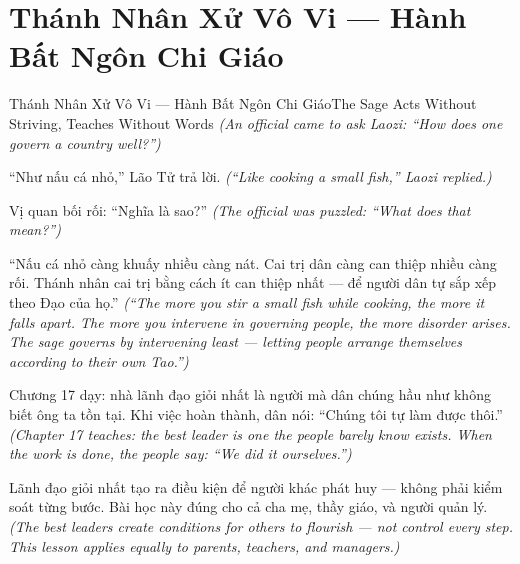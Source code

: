 \section{Thánh Nhân Xử Vô Vi — Hành Bất Ngôn Chi Giáo}
\begin{truyen}{Thánh Nhân Xử Vô Vi — Hành Bất Ngôn Chi Giáo}{The Sage Acts Without Striving, Teaches Without Words}
\textit{(An official came to ask Laozi: ``How does one govern a country well?'')}

``Như nấu cá nhỏ,'' Lão Tử trả lời.
\textit{(``Like cooking a small fish,'' Laozi replied.)}

Vị quan bối rối: ``Nghĩa là sao?''
\textit{(The official was puzzled: ``What does that mean?'')}

``Nấu cá nhỏ càng khuấy nhiều càng nát. Cai trị dân càng can thiệp nhiều càng rối. Thánh nhân cai trị bằng cách ít can thiệp nhất — để người dân tự sắp xếp theo Đạo của họ.''
\textit{(``The more you stir a small fish while cooking, the more it falls apart. The more you intervene in governing people, the more disorder arises. The sage governs by intervening least — letting people arrange themselves according to their own Tao.'')}

Chương 17 dạy: nhà lãnh đạo giỏi nhất là người mà dân chúng hầu như không biết ông ta tồn tại. Khi việc hoàn thành, dân nói: ``Chúng tôi tự làm được thôi.''
\textit{(Chapter 17 teaches: the best leader is one the people barely know exists. When the work is done, the people say: ``We did it ourselves.'')}

\end{truyen}

\begin{baihoc}
Lãnh đạo giỏi nhất tạo ra điều kiện để người khác phát huy — không phải kiểm soát từng bước. Bài học này đúng cho cả cha mẹ, thầy giáo, và người quản lý.
\textit{(The best leaders create conditions for others to flourish — not control every step. This lesson applies equally to parents, teachers, and managers.)}
\end{baihoc}
